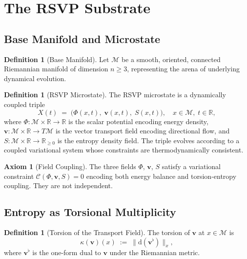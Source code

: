 \documentclass[11pt]{article}
\theoremstyle{plain}
\theoremstyle{definition}
\newtheorem{definition}[theorem]{Definition}
\newtheorem{axiom}[theorem]{Axiom}
\theoremstyle{remark}
\newcommand{\vv}{\mathbf{v}}
\newcommand{\Ss}{S}
\newcommand{\M}{\mathcal{M}}
\begin{document}

\section{The RSVP Substrate}

\subsection{Base Manifold and Microstate}

\begin{definition}[Base Manifold]
Let $\M$ be a smooth, oriented, connected Riemannian manifold of dimension
$n \geq 3$, representing the arena of underlying dynamical evolution.
\end{definition}

\begin{definition}[RSVP Microstate]
The RSVP microstate is a dynamically coupled triple
\[
  X(t) \;=\; \bigl(\Phi(x,t),\;\vv(x,t),\;\Ss(x,t)\bigr),
  \quad x \in \M,\; t \in \mathbb{R},
\]
where $\Phi : \M \times \mathbb{R} \to \mathbb{R}$ is the scalar potential
encoding energy density, $\vv : \M \times \mathbb{R} \to T\M$ is the vector
transport field encoding directional flow, and
$\Ss : \M \times \mathbb{R} \to \mathbb{R}_{\geq 0}$ is the entropy density
field. The triple evolves according to a coupled variational system whose
constraints are thermodynamically consistent.
\end{definition}

\begin{axiom}[Field Coupling]
The three fields $\Phi$, $\vv$, $\Ss$ satisfy a variational constraint
$\mathcal{C}(\Phi,\vv,\Ss) = 0$ encoding both energy balance and
torsion-entropy coupling. They are not independent.
\end{axiom}

\subsection{Entropy as Torsional Multiplicity}

\begin{definition}[Torsion of the Transport Field]
The torsion of $\vv$ at $x \in \M$ is
\[
  \kappa(\vv)(x) \;:=\; \bigl\|\mathrm{d}(\vv^\flat)\bigr\|_x,
\]
where $\vv^\flat$ is the one-form dual to $\vv$ under the Riemannian metric.
\end{definition}
\end{document}
